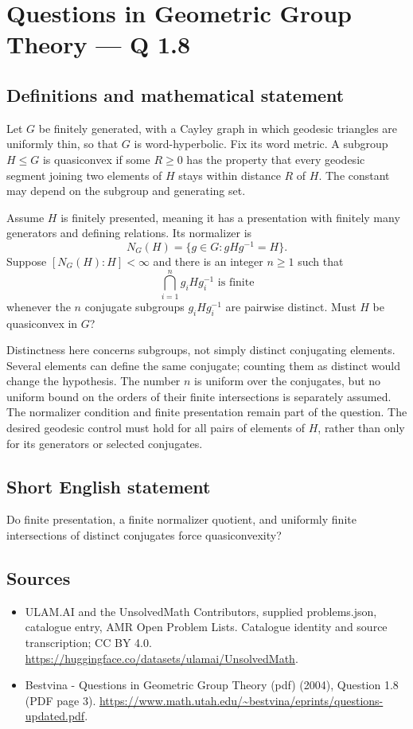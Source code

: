 \documentclass[11pt,a4paper]{article}
\begin{document}
\section*{Questions in Geometric Group Theory — Q 1.8}\label{statement}

\subsection{Definitions and mathematical statement}
Let $G$ be finitely generated, with a Cayley graph in which geodesic triangles are uniformly thin, so that $G$ is word-hyperbolic. Fix its word metric. A subgroup $H\leq G$ is quasiconvex if some $R\geq0$ has the property that every geodesic segment joining two elements of $H$ stays within distance $R$ of $H$. The constant may depend on the subgroup and generating set.

Assume $H$ is finitely presented, meaning it has a presentation with finitely many generators and defining relations. Its normalizer is
\[
 N_G(H)=\{g\in G:gHg^{-1}=H\}.
\]
Suppose $[N_G(H):H]<\infty$ and there is an integer $n\geq1$ such that
\[
 \bigcap_{i=1}^{n}g_iHg_i^{-1}\text{ is finite}
\]
whenever the $n$ conjugate subgroups $g_iHg_i^{-1}$ are pairwise distinct. Must $H$ be quasiconvex in $G$?

Distinctness here concerns subgroups, not simply distinct conjugating elements. Several elements can define the same conjugate; counting them as distinct would change the hypothesis. The number $n$ is uniform over the conjugates, but no uniform bound on the orders of their finite intersections is separately assumed. The normalizer condition and finite presentation remain part of the question. The desired geodesic control must hold for all pairs of elements of $H$, rather than only for its generators or selected conjugates.
\subsection{Short English statement}
Do finite presentation, a finite normalizer quotient, and uniformly finite intersections of distinct conjugates force quasiconvexity?
\subsection{Sources}
\begin{itemize}
\item[S1] ULAM.AI and the UnsolvedMath Contributors, supplied problems.json, catalogue entry, AMR Open Problem Lists. Catalogue identity and source transcription; CC BY 4.0.
\url{https://huggingface.co/datasets/ulamai/UnsolvedMath}.
\item[S2] Bestvina - Questions in Geometric Group Theory (pdf) (2004), Question 1.8 (PDF page 3). 
\url{https://www.math.utah.edu/~bestvina/eprints/questions-updated.pdf}.
\end{itemize}
\end{document}
